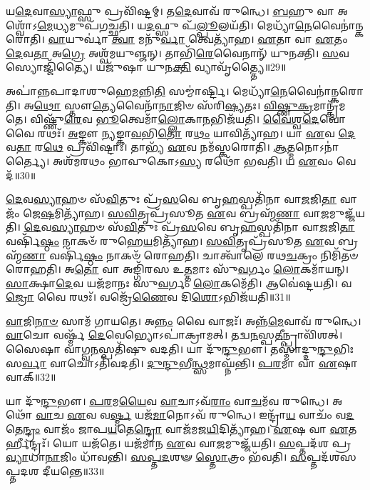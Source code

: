 𑌯\-\ul{𑌦𑍇}\-𑌵𑌾\-\ul{𑌸𑍍𑌯𑌾}\-𑌫𑍍𑌸𑍁 𑌪𑍍𑌰𑌵𑌿᳴𑌷𑍍𑌟𑌮𑍍।
𑌤\-\ul{𑌦𑍇}\-𑌵𑌾𑌵᳴ 𑌰𑍁𑌨𑍍𑌧𑍇।
\-\ul{𑌬}\-𑌹𑍁 𑌵𑌾 𑌅𑌶𑍍𑌵𑍋᳴\-𑌽\-\ul{𑌮𑍇}\-𑌧𑍍𑌯𑌮𑍁𑌪᳴\-𑌗𑌚𑍍𑌛𑌤𑌿।
𑌯\-\ul{𑌦}\-𑌫𑍍𑌸𑍁 𑌪᳴\-\ul{𑌲𑍍𑌪𑍂}\-𑌲𑌯᳴𑌤𑌿।
𑌮𑍇𑌧𑍍𑌯𑌾᳴\-\ul{𑌨𑍇}\-𑌵𑍈\-𑌨𑌾॑𑌨𑍍𑌕𑌰𑍋𑌤𑌿।
\-\ul{𑌵𑌾}\-𑌯𑍁𑌰𑍍𑌵𑌾॑ \ul{𑌤𑍍𑌵𑌾} 𑌮𑌨𑍁᳴\-\ul{𑌰𑍍𑌵𑌾} 𑌤𑍍𑌵𑍇𑌤𑍍𑌯𑌾᳴𑌹।
\-\ul{𑌏}\-𑌤𑌾 𑌵𑌾 \ul{𑌏}\-𑌤𑌂 \ul{𑌦𑍇}\-𑌵\-\ul{𑌤𑌾} 𑌅\-\ul{𑌗𑍍𑌰𑍇} 𑌅𑌶𑍍𑌵᳴𑌮𑌯𑍁𑌞𑍍𑌜𑌨𑍍।
𑌤𑌾𑌭𑌿᳴\-\ul{𑌰𑍇}\-𑌵𑍈𑌨𑌾𑌨𑍍᳴ 𑌯𑍁𑌨𑌕𑍍𑌤𑌿।
\-\ul{𑌸}\-𑌵𑌸𑍍𑌯𑍋𑌜𑍍𑌜𑌿᳴𑌤𑍍𑌯𑍈।
𑌯𑌜𑍁᳴𑌷𑌾 𑌯𑍁𑌨\-\ul{𑌕𑍍𑌤𑌿} 𑌵𑍍𑌯𑌾𑌵𑍃᳴𑌤𑍍𑌤𑍍𑌯𑍈॥29॥

𑌅𑌪𑌾॑𑌨𑍍𑌨𑌪𑌾𑌦𑌾𑌶𑍁𑌹𑍇\-\ul{𑌮}\-𑌨𑍍𑌨𑌿\-\ul{𑌤𑌿} 𑌸𑌮𑍍𑌮𑌾॑𑌰𑍍𑌷𑍍𑌟𑌿।
𑌮𑍇𑌧𑍍𑌯𑌾᳴\-\ul{𑌨𑍇}\-𑌵𑍈𑌨𑌾॑𑌨𑍍𑌕𑌰𑍋𑌤𑌿।
𑌅\-\ul{𑌥𑍋} 𑌸𑍍𑌤𑍗\-\ul{𑌤𑍍𑌯𑍇}\-𑌵𑍈𑌨𑌾᳴\-\ul{𑌨𑌾}\-𑌜𑌿𑍞 𑌸᳴𑌰𑌿\-\ul{𑌷𑍍𑌯}\-𑌤𑌃।
\-\ul{𑌵𑌿}\-\-\ul{𑌷𑍍𑌣𑍁}\-\-\ul{𑌕𑍍𑌰}\-𑌮𑌾𑌨𑍍𑌕𑍍𑌰᳴𑌮𑌤𑍇।
𑌵𑌿𑌷𑍍𑌣𑍁᳴\-\ul{𑌰𑍇}\-𑌵 \ul{𑌭𑍂}\-𑌤𑍍𑌵𑍇𑌮𑌾𑌁\-\ul{𑌲𑍍𑌲𑍋}\-𑌕𑌾\-\ul{𑌨}\-𑌭𑌿𑌜᳴𑌯𑌤𑌿।
\-\ul{𑌵𑍈}\-\-\ul{𑌶𑍍𑌵}\-\-\ul{𑌦𑍇}\-𑌵𑍋 𑌵𑍈 𑌰𑌥𑌃᳴।
\-\ul{𑌅}\-𑌙𑍍𑌕𑍗 \ul{𑌨𑍍𑌯}\-𑌙𑍍𑌕𑌾\-\ul{𑌵}\-𑌭𑌿\-\ul{𑌤𑍋} 𑌰\-\ul{𑌥𑌂} 𑌯𑌾𑌵𑌿𑌤𑍍𑌯𑌾᳴𑌹।
𑌯𑌾 \ul{𑌏}\-𑌵 \ul{𑌦𑍇}\-𑌵\-\ul{𑌤𑌾} 𑌰\-\ul{𑌥𑍇} 𑌪𑍍𑌰𑌵𑌿᳴𑌷𑍍𑌟𑌾𑌃।
𑌤𑌾𑌭𑍍𑌯᳴ \ul{𑌏}\-𑌵 𑌨𑌮᳴𑌸𑍍𑌕𑌰𑍋𑌤𑌿।
\-\ul{𑌆}\-𑌤𑍍𑌮𑌨𑍋\-𑌽𑌨𑌾॑𑌰𑍍𑌤𑍍𑌯𑍈।
𑌅𑌶᳴𑌮𑌰𑌥𑌂 𑌭𑌾𑌵𑍁𑌕𑍋\-𑌽\-\ul{𑌸𑍍𑌯} 𑌰𑌥𑍋᳴ 𑌭𑌵𑌤𑌿।
𑌯 \ul{𑌏}\-𑌵𑌂 𑌵𑍇𑌦᳴॥30॥\anuvakamend[\-\ul{𑌸𑍍𑌵}\-\-\ul{𑌦}\-\-\ul{𑌯}\-\-\ul{𑌤𑌿} \ul{𑌪}\-\-\ul{𑌲𑍍𑌪𑍂}\-𑌲𑌯᳴\-\ul{𑌤𑌿} 𑌵𑍍𑌯𑌾𑌵𑍃᳴\-\ul{𑌤𑍍𑌤𑍍𑌯𑌾} 𑌅𑌨𑌾॑\-\ul{𑌰𑍍𑌤𑍍𑌯𑍈} 𑌦𑍍𑌵𑍇 𑌚᳴]

\-\ul{𑌦𑍇}\-𑌵\-\ul{𑌸𑍍𑌯𑌾}\-𑌹𑍞 𑌸᳴\-\ul{𑌵𑌿}\-𑌤𑍁𑌃 𑌪𑍍𑌰᳴\-\ul{𑌸}\-𑌵𑍇 𑌬𑍃\-\ul{𑌹}\-𑌸𑍍𑌪𑌤𑌿᳴𑌨𑌾 𑌵𑌾\-\ul{𑌜}\-𑌜𑌿\-\ul{𑌤𑌾} 𑌵𑌾𑌜𑌂᳴ 𑌜𑍇\-\ul{𑌷}\-𑌮𑌿𑌤𑍍𑌯𑌾᳴𑌹।
\-\ul{𑌸}\-\-\ul{𑌵𑌿}\-𑌤𑍃𑌪𑍍𑌰᳴𑌸𑍂𑌤 \ul{𑌏}\-𑌵 𑌬𑍍𑌰𑌹𑍍𑌮᳴\-\ul{𑌣𑌾} 𑌵𑌾\-\ul{𑌜}\-𑌮𑍁𑌜𑍍𑌜᳴𑌯𑌤𑌿।
\-\ul{𑌦𑍇}\-𑌵\-\ul{𑌸𑍍𑌯𑌾}\-𑌹𑍞 𑌸᳴\-\ul{𑌵𑌿}\-𑌤𑍁𑌃 𑌪𑍍𑌰᳴\-\ul{𑌸}\-𑌵𑍇 𑌬𑍃\-\ul{𑌹}\-𑌸𑍍𑌪𑌤𑌿᳴𑌨𑌾 𑌵𑌾\-\ul{𑌜}\-𑌜𑌿\-\ul{𑌤𑌾} 𑌵𑌰𑍍\mbox{}𑌷𑌿᳴\-\ul{𑌷𑍍𑌠𑌂} 𑌨𑌾𑌕𑍞᳴ 𑌰𑍁𑌹𑍇\-\ul{𑌯}\-𑌮𑌿𑌤𑍍𑌯𑌾᳴𑌹।
\-\ul{𑌸}\-\-\ul{𑌵𑌿}\-𑌤𑍃𑌪𑍍𑌰᳴𑌸𑍂𑌤 \ul{𑌏}\-𑌵 𑌬𑍍𑌰𑌹𑍍𑌮᳴\-\ul{𑌣𑌾} 𑌵𑌰𑍍\mbox{}𑌷𑌿᳴\-\ul{𑌷𑍍𑌠𑌂} 𑌨𑌾𑌕𑍞᳴ 𑌰𑍋𑌹𑌤𑌿।
𑌚𑌾𑌤𑍍𑌵𑌾᳴𑌲𑍇 𑌰𑌥\-\ul{𑌚}\-𑌕𑍍𑌰𑌂 𑌨𑌿𑌮𑌿᳴𑌤𑍞 𑌰𑍋𑌹𑌤𑌿।
𑌅\-\ul{𑌤𑍋} 𑌵𑌾 𑌅𑌙𑍍𑌗𑌿᳴𑌰𑌸 𑌉\-\ul{𑌤𑍍𑌤}\-𑌮𑌾𑌃 𑌸𑍁᳴\-\ul{𑌵}\-𑌰𑍍𑌗𑌂 \ul{𑌲𑍋}\-𑌕𑌮𑌾᳴𑌯𑌨𑍍।
\-\ul{𑌸𑌾}\-𑌕𑍍𑌷𑌾\-\ul{𑌦𑍇}\-𑌵 𑌯𑌜᳴𑌮𑌾𑌨𑌃 𑌸𑍁\-\ul{𑌵}\-𑌰𑍍𑌗𑌂 \ul{𑌲𑍋}\-𑌕𑌮𑍇᳴𑌤𑌿।
𑌆𑌵𑍇॑𑌷𑍍𑌟𑌯𑌤𑌿।
𑌵\-\ul{𑌜𑍍𑌰𑍋} 𑌵𑍈 𑌰𑌥𑌃᳴।
𑌵𑌜𑍍𑌰𑍇᳴\-\ul{𑌣𑍈}\-𑌵 𑌦𑌿\-\ul{𑌶𑍋}\-\-𑌽𑌭𑌿𑌜᳴𑌯𑌤𑌿॥31॥

\-\ul{𑌵𑌾}\-𑌜𑌿\-\ul{𑌨𑌾}\-\-\ul{𑍞} 𑌸𑌾𑌮᳴ 𑌗𑌾𑌯𑌤𑍇।
𑌅\-\ul{𑌨𑍍𑌨𑌂} 𑌵𑍈 𑌵𑌾𑌜𑌃᳴।
𑌅𑌨𑍍𑌨᳴\-\ul{𑌮𑍇}\-𑌵𑌾𑌵᳴ 𑌰𑍁𑌨𑍍𑌧𑍇।
\-\ul{𑌵𑌾}\-𑌚𑍋 𑌵𑌰𑍍𑌷𑍍𑌮᳴ \ul{𑌦𑍇}\-𑌵𑍇𑌭𑍍𑌯𑍋\-𑌽𑌪𑌾॑𑌕𑍍𑌰𑌾𑌮𑌤𑍍।
𑌤𑌦𑍍𑌵\-\ul{𑌨}\-𑌸𑍍𑌪\-\ul{𑌤𑍀}\-𑌨𑍍𑌪𑍍𑌰𑌾𑌵𑌿᳴𑌶𑌤𑍍।
𑌸𑍈𑌷𑌾 𑌵𑌾𑌗𑍍𑌵\-\ul{𑌨}\-𑌸𑍍𑌪𑌤𑌿᳴𑌷𑍁 𑌵𑌦𑌤𑌿।
𑌯𑌾 𑌦𑍁᳴\-\ul{𑌨𑍍𑌦𑍁}\-𑌭𑍗।
𑌤𑌸𑍍𑌮𑌾॑𑌦𑍍𑌦𑍁\-\ul{𑌨𑍍𑌦𑍁}\-𑌭𑌿𑌃 𑌸\-\ul{𑌰𑍍𑌵𑌾} 𑌵𑌾𑌚𑍋\-𑌽𑌤𑌿᳴𑌵𑌦𑌤𑌿।
\-\ul{𑌦𑍁}\-\-\ul{𑌨𑍍𑌦𑍁}\-𑌭𑍀\-\ul{𑌨𑍍𑌥𑍍𑌸}\-𑌮𑌾𑌘𑍍𑌨᳴𑌨𑍍𑌤𑌿।
\-\ul{𑌪}\-\-\ul{𑌰}\-𑌮𑌾 𑌵𑌾 \ul{𑌏}\-𑌷𑌾 𑌵𑌾𑌕𑍍॥32॥

𑌯𑌾 𑌦𑍁᳴\-\ul{𑌨𑍍𑌦𑍁}\-𑌭𑍗।
\-\ul{𑌪}\-\-\ul{𑌰}\-𑌮\-\ul{𑌯𑍈}\-𑌵 \ul{𑌵𑌾}\-𑌚𑌾\-𑌽𑌵᳴\-\ul{𑌰𑌾𑌂} 𑌵𑌾\-\ul{𑌚}\-𑌮᳴𑌵 𑌰𑍁𑌨𑍍𑌧𑍇।
𑌅𑌥𑍋᳴ \ul{𑌵𑌾}\-𑌚 \ul{𑌏}\-𑌵 𑌵\-\ul{𑌰𑍍𑌷𑍍𑌮} 𑌯𑌜᳴\-\ul{𑌮𑌾}\-𑌨𑍋\-𑌽𑌵᳴ 𑌰𑍁𑌨𑍍𑌧𑍇।
𑌇𑌨𑍍𑌦𑍍𑌰𑌾᳴\-\ul{𑌯} 𑌵𑌾𑌚𑌂᳴ 𑌵\-\ul{𑌦}\-𑌤𑍇\-\ul{𑌨𑍍𑌦𑍍𑌰𑌂} 𑌵𑌾𑌜𑌂᳴ 𑌜𑌾𑌪\-\ul{𑌯}\-𑌤𑍇\-\ul{𑌨𑍍𑌦𑍍𑌰𑍋} 𑌵𑌾𑌜᳴𑌮𑌜\-\ul{𑌯𑌿}\-𑌦𑌿𑌤𑍍𑌯𑌾᳴𑌹।
\-\ul{𑌏}\-𑌷 𑌵𑌾 \ul{𑌏}\-𑌤𑌰𑍍\mbox{}𑌹𑍀𑌨𑍍𑌦𑍍𑌰𑌃᳴।
𑌯𑍋 𑌯𑌜᳴𑌤𑍇।
𑌯𑌜᳴𑌮𑌾𑌨 \ul{𑌏}\-𑌵 𑌵𑌾\-\ul{𑌜}\-𑌮𑍁𑌜𑍍𑌜᳴𑌯𑌤𑌿।
\-\ul{𑌸}\-𑌪𑍍𑌤𑌦᳴𑌶 𑌪𑍍𑌰\-\ul{𑌵𑍍𑌯𑌾}\-𑌧𑌾\-\ul{𑌨𑌾}\-𑌜𑌿𑌂 𑌧𑌾᳴𑌵𑌨𑍍𑌤𑌿।
\-\ul{𑌸}\-\-\ul{𑌪𑍍𑌤}\-\-\ul{𑌦}\-𑌶𑍟 \ul{𑌸𑍍𑌤𑍋}\-𑌤𑍍𑌰𑌂 𑌭᳴𑌵𑌤𑌿।
\-\ul{𑌸}\-𑌪𑍍𑌤𑌦᳴𑌶𑌸𑌪𑍍𑌤𑌦𑌶 𑌦𑍀𑌯𑌨𑍍𑌤𑍇॥33॥

